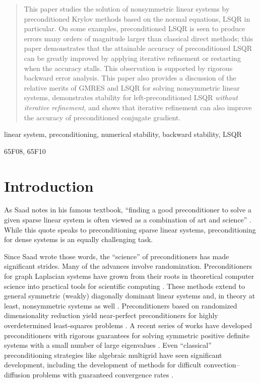 \documentclass[onefignum,onetabnum,pagebackref,dvipsnames]{siamart220329}
\begin{document}
\maketitle

\begin{abstract}
    This paper studies the solution of nonsymmetric linear systems by preconditioned Krylov methods based on the normal equations, LSQR in particular.
    On some examples, preconditioned LSQR is seen to produce errors many orders of magnitude larger than classical direct methods; this paper demonstrates that the attainable accuracy of preconditioned LSQR can be greatly improved by applying iterative refinement or restarting when the accuracy stalls.
    This observation is supported by rigorous backward error analysis.
    This paper also provides a discussion of the relative merits of GMRES and LSQR for solving nonsymmetric linear systems, demonstrates stability for left-preconditioned LSQR \emph{without iterative refinement}, and shows that iterative refinement can also improve the accuracy of preconditioned conjugate gradient.
\end{abstract}


\begin{keywords}
    linear system, preconditioning, numerical stability, backward stability, LSQR
\end{keywords}


\begin{MSCcodes}
    65F08, 65F10
\end{MSCcodes}

\section{Introduction}

As Saad notes in his famous textbook, ``finding a good preconditioner to solve a given sparse linear system is often viewed as a combination of art and science'' \cite[p.~283]{Saa03}. 
While this quote speaks to preconditioning sparse linear systems, preconditioning for dense systems is an equally challenging task.

Since Saad wrote those words, the ``science'' of preconditioners has made significant strides.
Many of the advances involve randomization.
Preconditioners for graph Laplacian systems have grown from their roots in theoretical computer science \cite{ST04,KOSZ13,KS16} into practical tools for scientific computing \cite{CLB21,GKS23,LB12}.
These methods extend to general symmetric (weakly) diagonally dominant linear systems and, in theory at least, nonsymmetric systems as well \cite{Kyn17,FM18}.
Preconditioners based on randomized dimensionality reduction yield near-perfect preconditioners for highly overdetermined least-squares problems \cite{RT08,AMT10}.
A recent series of works have developed preconditioners with rigorous guarantees for solving symmetric positive definite systems with a small number of large eigenvalues \cite{FTU23,DEF+23,DMY24,COCF16}.
Even ``classical'' preconditioning strategies like algebraic multigrid have seen significant development, including the development of methods for difficult convection--diffusion problems with guaranteed convergence rates \cite{Not12}.
\end{document}
